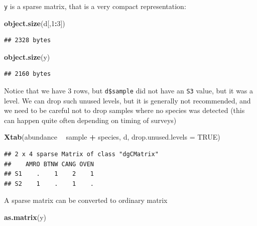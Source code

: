 \documentclass[12pt,]{book}
\newenvironment{Shaded}{\begin{snugshade}}{\end{snugshade}}
\newcommand{\DataTypeTok}[1]{\textcolor[rgb]{0.13,0.29,0.53}{#1}}
\newcommand{\DecValTok}[1]{\textcolor[rgb]{0.00,0.00,0.81}{#1}}
\newcommand{\KeywordTok}[1]{\textcolor[rgb]{0.13,0.29,0.53}{\textbf{#1}}}
\newcommand{\NormalTok}[1]{#1}
\newcommand{\OperatorTok}[1]{\textcolor[rgb]{0.81,0.36,0.00}{\textbf{#1}}}
\newcommand{\OtherTok}[1]{\textcolor[rgb]{0.56,0.35,0.01}{#1}}
\newcommand{\StringTok}[1]{\textcolor[rgb]{0.31,0.60,0.02}{#1}}
\begin{document}
\texttt{y} is a sparse matrix, that is a very compact representation:

\begin{Shaded}
\begin{Highlighting}[]
\KeywordTok{object.size}\NormalTok{(d[,}\DecValTok{1}\OperatorTok{:}\DecValTok{3}\NormalTok{])}
\end{Highlighting}
\end{Shaded}

\begin{verbatim}
## 2328 bytes
\end{verbatim}

\begin{Shaded}
\begin{Highlighting}[]
\KeywordTok{object.size}\NormalTok{(y)}
\end{Highlighting}
\end{Shaded}

\begin{verbatim}
## 2160 bytes
\end{verbatim}

Notice that we have 3 rows, but \texttt{d\$sample} did not have an \texttt{S3} value, but it was a level.
We can drop such unused levels, but it is generally not recommended, and we need to be careful
not to drop samples where no species was detected (this can happen quite often depending on timing of
surveys)

\begin{Shaded}
\begin{Highlighting}[]
\KeywordTok{Xtab}\NormalTok{(abundance }\OperatorTok{~}\StringTok{ }\NormalTok{sample }\OperatorTok{+}\StringTok{ }\NormalTok{species, d, }\DataTypeTok{drop.unused.levels =} \OtherTok{TRUE}\NormalTok{)}
\end{Highlighting}
\end{Shaded}

\begin{verbatim}
## 2 x 4 sparse Matrix of class "dgCMatrix"
##    AMRO BTNW CANG OVEN
## S1    .    1    2    1
## S2    1    .    1    .
\end{verbatim}

A sparse matrix can be converted to ordinary matrix

\begin{Shaded}
\begin{Highlighting}[]
\KeywordTok{as.matrix}\NormalTok{(y)}
\end{Highlighting}
\end{Shaded}
\end{document}
